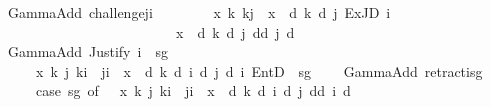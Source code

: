 \begin{isabellebody}
\ \ {\isacharbar}{\kern0pt}\ {\isachardoublequoteopen}GammaAdd\ challenge{\isacharbrackleft}{\kern0pt}j{\isacharcomma}{\kern0pt}i{\isacharcomma}{\kern0pt}{\isasymphi}{\isacharbrackright}{\kern0pt}\ {\isacharequal}{\kern0pt}\isanewline
\ \ \ \ \ \ \ {\isacharparenleft}{\kern0pt}{\isasymlambda}x{\isachardot}{\kern0pt}\ {\isasymexists}k{\isachardot}{\kern0pt}\ k{\isasymnoteq}j\ {\isasymand}\ {\isacharparenleft}{\kern0pt}x\ {\isacharequal}{\kern0pt}\ {\isasymB}\isactrlsup d\ k\ {\isacharparenleft}{\kern0pt}{\isasymD}\isactrlsup d\ j\ {\isacharparenleft}{\kern0pt}ExJD\ i\ {\isasymoplus}\ {\isasymphi}{\isacharparenright}{\kern0pt}{\isacharparenright}{\kern0pt}\isanewline
\ \ \ \ \ \ \ \ \ \ \ \ \ \ \ \ \ \ \ \ \ \ \ \ \ \ {\isasymor}\ x\ {\isacharequal}{\kern0pt}\ {\isasymB}\isactrlsup d\ k\ {\isacharparenleft}{\kern0pt}{\isasymD}\isactrlsup d\ j\ {\isacharparenleft}{\kern0pt}{\isasymnot}\isactrlsup d{\isacharparenleft}{\kern0pt}{\isasymB}\isactrlsup d\ j\ {\isacharbraceleft}{\kern0pt}{\isasymphi}{\isacharbraceright}{\kern0pt}\isactrlsup d{\isacharparenright}{\kern0pt}{\isacharparenright}{\kern0pt}{\isacharparenright}{\kern0pt}{\isacharparenright}{\kern0pt}{\isacharparenright}{\kern0pt}{\isachardoublequoteclose}\isanewline
\ \ {\isacharbar}{\kern0pt}\ {\isachardoublequoteopen}GammaAdd\ {\isacharparenleft}{\kern0pt}Justify\ i\ {\isasymPhi}\ sg\ {\isasymphi}{\isacharparenright}{\kern0pt}\ {\isacharequal}{\kern0pt}\isanewline
\ \ \ \ \ \ \ {\isacharparenleft}{\kern0pt}{\isasymlambda}x{\isachardot}{\kern0pt}\ {\isasymexists}k\ j{\isachardot}{\kern0pt}\ k{\isasymnoteq}i\ {\isasymand}\ j{\isasymnoteq}i\ {\isasymand}\ x\ {\isacharequal}{\kern0pt}\ {\isasymB}\isactrlsup d\ k\ {\isacharparenleft}{\kern0pt}{\isasymD}\isactrlsup d\ i\ {\isacharparenleft}{\kern0pt}{\isasymB}\isactrlsup d\ j\ {\isacharparenleft}{\kern0pt}{\isasymB}\isactrlsup d\ i\ {\isacharparenleft}{\kern0pt}EntD\ {\isasymPhi}\ sg\ {\isasymphi}{\isacharparenright}{\kern0pt}{\isacharparenright}{\kern0pt}{\isacharparenright}{\kern0pt}{\isacharparenright}{\kern0pt}{\isacharparenright}{\kern0pt}{\isachardoublequoteclose}\isanewline
\ \ {\isacharbar}{\kern0pt}\ {\isachardoublequoteopen}GammaAdd\ retract{\isacharbrackleft}{\kern0pt}i{\isacharcomma}{\kern0pt}{\isasymphi}{\isacharcomma}{\kern0pt}sg{\isacharbrackright}{\kern0pt}\ {\isacharequal}{\kern0pt}\isanewline
\ \ \ \ \ \ \ {\isacharparenleft}{\kern0pt}case\ sg\ of\ {\isasymoplus}\ {\isasymRightarrow}\ {\isacharparenleft}{\kern0pt}{\isasymlambda}x{\isachardot}{\kern0pt}\ {\isasymexists}k\ j{\isachardot}{\kern0pt}\ k{\isasymnoteq}i\ {\isasymand}\ j{\isasymnoteq}i\ {\isasymand}\ x\ {\isacharequal}{\kern0pt}\ {\isasymB}\isactrlsup d\ k\ {\isacharparenleft}{\kern0pt}{\isasymD}\isactrlsup d\ i\ {\isacharparenleft}{\kern0pt}{\isasymB}\isactrlsup d\ j\ {\isacharparenleft}{\kern0pt}{\isasymnot}\isactrlsup d{\isacharparenleft}{\kern0pt}{\isasymB}\isactrlsup d\ i\ {\isacharbraceleft}{\kern0pt}{\isasymphi}{\isacharbraceright}{\kern0pt}\isactrlsup d{\isacharparenright}{\kern0pt}{\isacharparenright}{\kern0pt}{\isacharparenright}{\kern0pt}{\isacharparenright}{\kern0pt}{\isacharparenright}{\kern0pt}\isanewline

\end{isabellebody}
